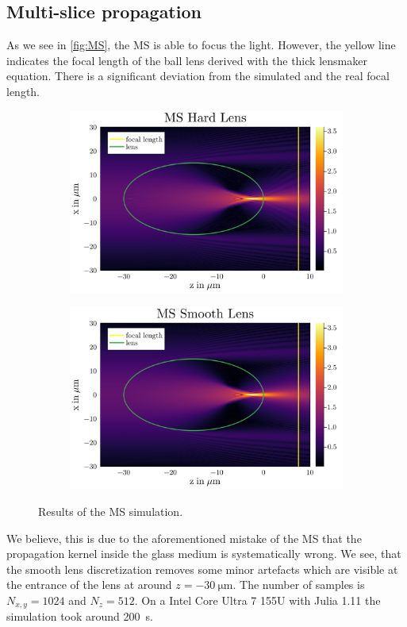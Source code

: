 \documentclass[a4paper,12pt]{article}
\begin{document}
\subsection{Multi-slice propagation}
As we see in \autoref{fig:MS}, the MS is able to focus the light. However, the yellow line indicates the focal length of the ball lens derived with the thick lensmaker equation. There is a significant deviation from the simulated and the real focal length.
\begin{figure}[h]
    \centering
    \begin{subfigure}[]{0.5\textwidth}
        \centering
        \includegraphics[width=\textwidth]{../figures/MS_hard.svg.png} 
    \end{subfigure}%
    \begin{subfigure}[]{0.5\textwidth}
        \centering
        \includegraphics[width=\textwidth]{../figures/MS_soft.svg.png} 
    \end{subfigure}
    \caption{Results of the MS simulation.}
    \label{fig:MS}
\end{figure}
We believe, this is due to the aforementioned mistake of the MS that the propagation kernel inside the glass medium is systematically wrong.
We see, that the smooth lens discretization removes some minor artefacts which are visible at the entrance of the lens at around $z=\SI{-30}{\micro\meter}$.
The number of samples is $N_{x,y} = 1024$ and $N_z=512$. On a Intel Core Ultra 7 155U with Julia 1.11 the simulation took around \SI{200}{\second}.
\end{document}
